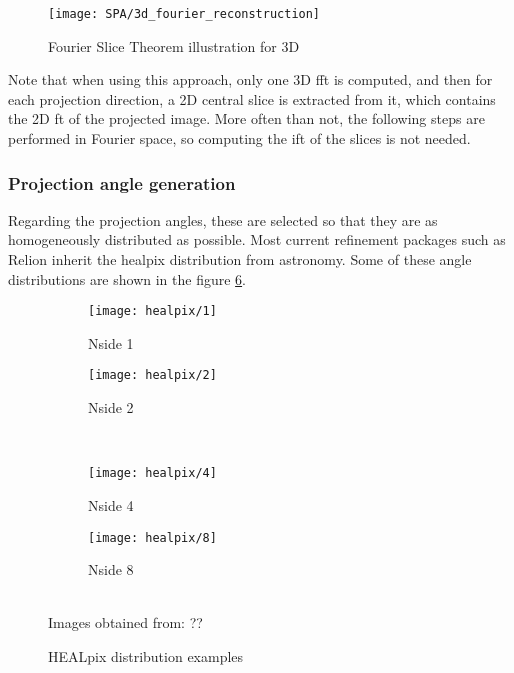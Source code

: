 \documentclass[../main.tex]{subfiles}
\begin{document}
\begin{figure}[h]
    \centering
    \texttt{[image: SPA/3d\_fourier\_reconstruction]}\\
    \cite{nogales2015}
    \caption{Fourier Slice Theorem illustration for 3D}
    \label{fig:3:3dfourier}
\end{figure}

Note that when using this approach, only one 3D \gls{fft} is computed, and then for each projection direction, a 2D central slice is extracted from it, which contains the 2D \gls{ft} of the projected image. More often than not, the following steps are performed in Fourier space, so computing the \gls{ift} of the slices is not needed.

\subsubsection{Projection angle generation}
Regarding the projection angles, these are selected so that they are as homogeneously distributed as possible. Most current refinement packages such as Relion inherit the \gls{healpix} distribution from astronomy. Some of these angle distributions are shown in the figure \ref{fig:3:healpix}.

\begin{figure}[h]
    \centering
    \begin{subfigure}[b]{0.33\textwidth}
         \centering
         \texttt{[image: healpix/1]}
         \caption{Nside 1}
         \label{fig:3:healpix:1}
    \end{subfigure}
    \begin{subfigure}[b]{0.33\textwidth}
         \centering
         \texttt{[image: healpix/2]}
         \caption{Nside 2}
         \label{fig:3:healpix:2}
    \end{subfigure}
    \\
    \begin{subfigure}[b]{0.33\textwidth}
         \centering
         \texttt{[image: healpix/4]}
         \caption{Nside 4}
         \label{fig:3:healpix:4}
    \end{subfigure}
    \begin{subfigure}[b]{0.33\textwidth}
         \centering
         \texttt{[image: healpix/8]}
         \caption{Nside 8}
         \label{fig:3:healpix:8}
    \end{subfigure}\\
    Images obtained from: ??
    \caption{HEALpix distribution examples}
    \label{fig:3:healpix}
\end{figure}
\end{document}
